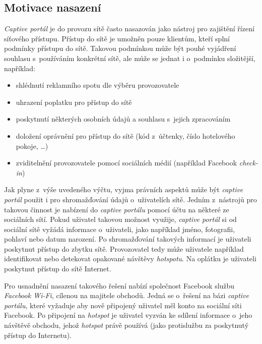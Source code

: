 \documentclass[thesis=M,czech]{FITthesis}[2012/10/20]
\begin{document}
\subsection{Motivace nasazení}


\textit{Captive portál} je do provozu sítě často nasazován jako nástroj pro zajištění řízení síťového přístupu. Přístup do sítě je umožněn pouze klientům, kteří splní podmínky přístupu do sítě. Takovou podmínkou může být pouhé vyjádření souhlasu s~používáním konkrétní sítě, ale může se jednat i o~podmínku složitější, například:

\begin{itemize}
 \item shlédnutí reklamního spotu dle výběru provozovatele
 \item uhrazení poplatku pro přístup do sítě
 \item poskytnutí některých osobních údajů a souhlasu s~jejich zpracováním
 \item doložení oprávnění pro přístup do sítě (kód z~účtenky, číslo hotelového pokoje, \ldots)
 \item zviditelnění provozovatele pomocí sociálních médií (například Facebook \textit{check-in})
\end{itemize}

Jak plyne z~výše uvedeného výčtu, vyjma právních aspektů může být \textit{captive portál} použit i pro shromažďování údajů o~uživatelích sítě. Jedním z~nástrojů pro takovou činnost je nabízení  do \textit{captive portálu} pomocí účtu na některé ze sociálních sítí. Pokud uživatel takovou možnost využije, \textit{captive portál} si od sociální sítě vyžádá informace o~uživateli, jako například jméno, fotografii, pohlaví nebo datum narození. Po shromažďování takových informací je uživateli poskytnut přístup do zbytku sítě. Provozovatel tedy může uživatele například identifikovat nebo detekovat opakované návštěvy \textit{hotspotu}. Na oplátku je uživateli  poskytnut přístup do sítě Internet.


Pro usnadnění nasazení takového řešení nabízí společnost Facebook službu \textit{Facebook Wi-Fi}\cite{facebook-wifi}, cílenou na majitele obchodů. Jedná se o~řešení na bázi \textit{captive portálu}, které vyžaduje aby nově připojený uživatel měl konto na sociální síti Facebook. Po připojení na \textit{hotspot} je uživatel vyzván ke sdílení informace o~jeho návštěvě obchodu, jehož \textit{hotspot} právě používá (jako protislužbu za poskytnutý přístup do Internetu).
\end{document}
